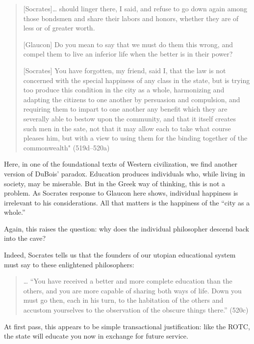 \begin{quote}

[Socrates]{\ldots} should linger there, I said, and refuse to go down again among those bondsmen and share their labors and honors, whether they are of less or of greater worth.

[Glaucon] Do you mean to say that we must do them this wrong, and compel them to live an inferior life when the better is in their power?

[Socrates] You have forgotten, my friend, said I, that the law is not concerned with the special happiness of any class in the state, but is trying too produce this condition in the city as a whole, harmonizing and adapting the citizens to one another by persuasion and compulsion, and requiring them to impart to one another any benefit which they are severally able to bestow upon the community, and that it itself creates such men in the sate, not that it may allow each to take what course pleases him, but with a view to using them for the binding together of the commonwealth" (519d--520a)
\end{quote}

Here, in one of the foundational texts of Western civilization, we find another version of DuBois' paradox. Education produces individuals who, while living in society, may be miserable. But in the Greek way of thinking, this is not a problem. As Socrates response to Glaucon here shows, individual happiness is irrelevant to his considerations. All that matters is the happiness of the ``city as a whole.'' \begin{question}Again, this raises the question: why does the individual philosopher descend back into the cave?\end{question}

Indeed, Socrates tells us that the founders of our utopian educational system must say to these enlightened philosophers:

\begin{quote}

{\ldots} ``You have received a better and more complete education than the others, and you are more capable of sharing both ways of life. Down you must go then, each in his turn, to the habitation of the others and accustom yourselves to the observation of the obscure things there.'' (520c)
\end{quote}

At first pass, this appears to be simple transactional justification: like the ROTC, the state will educate you now in exchange for future service. 

